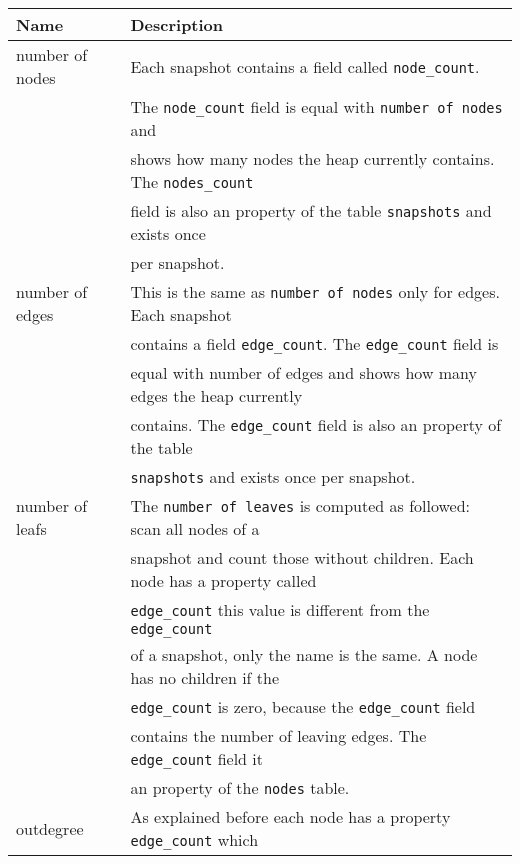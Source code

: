 \begin{table}[!htbp]
	\centering
	\begin{tabular}{|l||l|}
		\hline
		\textbf{Name}	&	\textbf{Description}				\\ \hline \hline
		number of nodes & Each snapshot contains a field 
						  called \texttt{node\_count}.  			\\
						& The \texttt{node\_count} field is equal 
						  with \texttt{number of nodes} and			\\
						& shows how many nodes the heap currently 
						  contains. The \texttt{nodes\_count} 		\\
						& field is also an property of the table
						  \texttt{snapshots} and exists once		\\
						& per snapshot.								\\ \hline
		number of edges	& This is the same as \texttt{number of nodes} 
						  only for edges. Each snapshot 			\\
						& contains a field \texttt{edge\_count}. 
						  The \texttt{edge\_count} field is 		\\
						& equal with number of edges and shows how 
						  many edges the heap currently 			\\
						& contains. The \texttt{edge\_count} field 
						  is also an property of the table 			\\
						& \texttt{snapshots} and exists once per 
						  snapshot.									\\ \hline
		number of leafs	& The \texttt{number of leaves} is computed 
						  as followed: scan all nodes of a 			\\
						& snapshot and count those without children. 
						  Each node has a property called 			\\
						& \texttt{edge\_count} this value is 
						  different from the \texttt{edge\_count} 	\\
						& of a snapshot, only the name is the same. 
						  A node has no children if the 			\\
						& \texttt{edge\_count} is zero, because the
						  \texttt{edge\_count} field 				\\
						& contains the number of leaving edges. The
						  \texttt{edge\_count} field it 			\\
						& an property of the \texttt{nodes} table.	\\ \hline
		outdegree		& As explained before each node has a 
						  property \texttt{edge\_count} which 		\\

\end{tabular}
\end{table}
